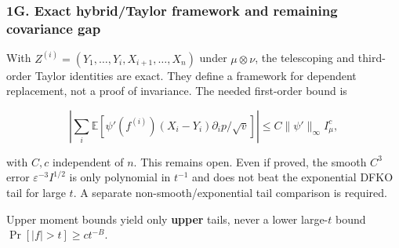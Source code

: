 \subsubsection{1G. Exact hybrid/Taylor framework and remaining covariance gap}\label{g.-exact-hybridtaylor-framework-and-remaining-covariance-gap}

With \(Z^{(i)}=(Y_1,\dots,Y_i,X_{i+1},\dots,X_n)\) under \(\mu\otimes\nu\), the telescoping and third-order Taylor identities are exact. They define a framework for dependent replacement, not a proof of invariance. The needed first-order bound is

\[\left|\sum_i\mathbb E\!\left[\psi'(f^{(i)})(X_i-Y_i)\partial_i p/\sqrt v\right]\right|
\le C\|\psi'\|_\infty I_\mu^c,\]

with \(C,c\) independent of \(n\). This remains open. Even if proved, the smooth \(C^3\) error \(\varepsilon^{-3}I^{1/2}\) is only polynomial in \(t^{-1}\) and does not beat the exponential DFKO tail for large \(t\). A separate non-smooth/exponential tail comparison is required.

Upper moment bounds yield only \textbf{upper} tails, never a lower large-\(t\) bound \(\Pr[|f|>t]\ge ct^{-B}\).
